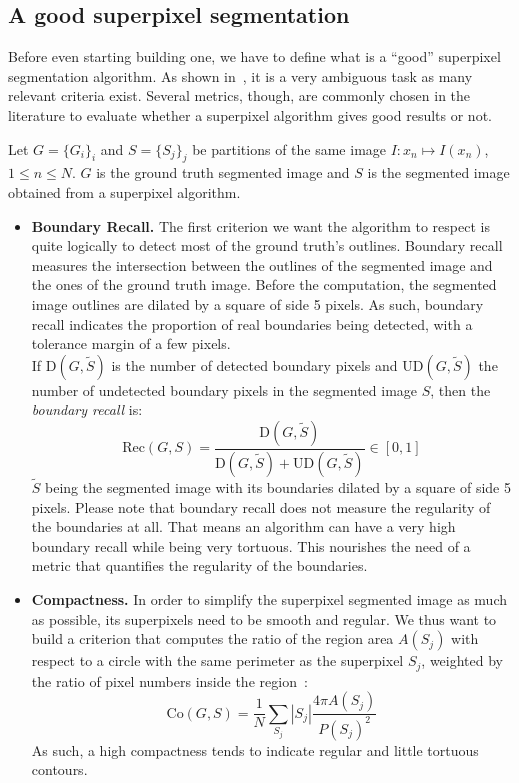 \documentclass{article}
\begin{document}
    \subsection{A good superpixel segmentation}
        \label{par:metrics}
        Before even starting building one, we have to define what is a ``good'' superpixel segmentation algorithm. As shown in~\cite{stutz2017}, it is a very ambiguous task as many relevant criteria exist. Several metrics, though, are commonly chosen in the literature to evaluate whether a superpixel algorithm gives good results or not.

        Let $G = \{G_i\}_i$ and $S = \{S_j\}_j$ be partitions of the same image $I : x_n \mapsto I(x_n)$, $1 \leq n \leq N$. $G$ is the ground truth segmented image and $S$ is the segmented image obtained from a superpixel algorithm.
        \begin{itemize}
            \item \textbf{Boundary Recall.} The first criterion we want the algorithm to respect is quite logically to detect most of the ground truth's outlines. Boundary recall measures the intersection between the outlines of the segmented image and the ones of the ground truth image. Before the computation, the segmented image outlines are dilated by a square of side 5 pixels. As such, boundary recall indicates the proportion of real boundaries being detected, with a tolerance margin of a few pixels.\\
            If $\text{D}(G,\tilde{S})$ is the number of detected boundary pixels and $\text{UD}(G,\tilde{S})$ the number of undetected boundary pixels in the segmented image $S$, then the \textit{boundary recall} is:
            $$
            \mathrm{Rec}(G,S)=\frac{\mathrm{D}(G,\tilde{S})}{\mathrm{D}(G,\tilde{S})+\mathrm{UD}(G,\tilde{S})} \in [0,1]
            $$
            $\tilde{S}$ being the segmented image with its boundaries dilated by a square of side 5 pixels. Please note that boundary recall does not measure the regularity of the boundaries at all. That means an algorithm can have a very high boundary recall while being very tortuous. This nourishes the need of a metric that quantifies the regularity of the boundaries.

            \item \textbf{Compactness.} In order to simplify the superpixel segmented image as much as possible, its superpixels need to be smooth and regular. We thus want to build a criterion that computes the ratio of the region area $A(S_j)$ with respect to a circle with the same perimeter as the superpixel $S_j$, weighted by the ratio of pixel numbers inside the region~\cite{schick2012}:
            $$
            \mathrm{Co}(G, S)=\frac{1}{N} \sum_{S_j}|S_j| \frac{4 \pi A(S_j)}{P(S_j)^2}
            $$
            As such, a high compactness tends to indicate regular and little tortuous contours.


\end{itemize}
\end{document}
